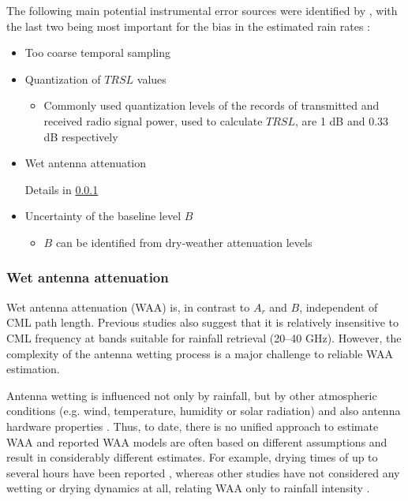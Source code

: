 \documentclass{ctuthesis}\usepackage[]{graphicx}\usepackage[]{color}
\begin{document}
The following main potential instrumental error sources were identified by \cite{leijnseErrorsUncertaintiesMicrowave2010}, with the last two being most important for the bias in the estimated rain rates \citep{chwalaCommercialMicrowaveLink2019}: 
\begin{itemize}
        \item Too coarse temporal sampling
        \item Quantization of $T\!R\!S\!L$ values 
        \begin{itemize}
                \item Commonly used quantization levels of the records of transmitted and received radio signal power, used to calculate $T\!R\!S\!L$, are 1 dB and 0.33 dB respectively
        \end{itemize}
        \item Wet antenna attenuation
        \begin{itemize}
                Details in \ref{WAAtheor}
        \end{itemize}
        \item Uncertainty of the baseline level $B$
        \begin{itemize}
                \item $B$ can be identified from dry-weather attenuation levels
        \end{itemize}
\end{itemize}




\subsubsection{Wet antenna attenuation} \label{WAAtheor}

Wet antenna attenuation (WAA) is, in contrast to $A_r$ and $B$, independent of CML path length. Previous studies \citep{leijnseMicrowaveLinkRainfall2008, overeemMeasuringUrbanRainfall2011} also suggest that it is relatively insensitive to CML frequency at bands suitable for rainfall retrieval (20--40 GHz). However, the complexity of the antenna wetting process is a major challenge to reliable WAA estimation. 

Antenna wetting is influenced not only by rainfall, but by other atmospheric conditions (e.g. wind, temperature, humidity or solar radiation) and also  antenna hardware properties \citep[e.g. antenna radome material or coating;][]{lethMeasurementCampaignAssess2018}. Thus, to date, there is no unified approach to estimate WAA and reported WAA models are often based on different assumptions and result in considerably different estimates. For example, drying times of up to several hours have been reported \citep{schleissQuantificationModelingWetAntenna2013}, whereas other studies have not considered any wetting or drying dynamics at all, relating WAA only to rainfall intensity \citep{valtrExcessAttenuationCaused2019, kharadlyEffectWetAntenna2001}. 
\end{document}
